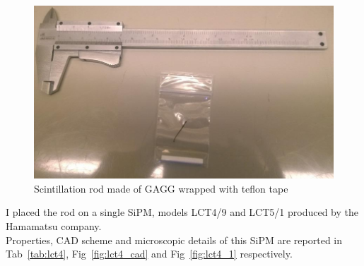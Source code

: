 \documentclass[10pt,a4paper, openany]{book}
\begin{document}
\begin{figure}[!h]
\begin{center}
\includegraphics[scale=0.33]{imm/gagg1.jpg}
\end{center}
\caption{Scintillation rod made of GAGG wrapped with teflon tape}
\label{fig:gagg1}
\end{figure}

I placed the rod on a single SiPM, models LCT4/9 and LCT5/1 produced by the Hamamatsu company.\\
Properties, CAD scheme and microscopic details of this SiPM are reported in Tab~\ref{tab:lct4}, Fig~\ref{fig:lct4_cad} and Fig~\ref{fig:lct4_1} respectively.
\end{document}
